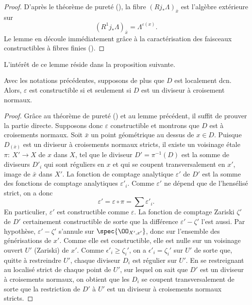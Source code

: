 \documentclass[10pt]{../fichiers-configuration-latex/smfart}
\begin{document}
\begin{proof}D'après le théorème de pureté (), la
fibre $(Rj_*\Lambda)_{\bar x}$ est l'algèbre extérieure sur $$(R^1j_*\Lambda)_{\bar
x}=\Lambda^{\varepsilon(x)}.$$ Le lemme en découle immédiatement grâce à la caractérisation des
faisceaux constructibles à fibres finies ().\end{proof}

L'intérêt de ce lemme réside dans la proposition  suivante.

\begin{proposition} Avec les notations précédentes, supposons de plus que $D$ est localement dcn.
Alors, $\varepsilon$ est constructible si et seulement si $D$ est un diviseur à croisement
normaux.\end{proposition}

\begin{proof} Grâce au théorème de pureté () et au
lemme précédent, il suffit de prouver la partie directe. Supposons donc $\varepsilon$ constructible
et montrons que $D$ est à croisements normaux. Soit $\bar x$ un point géométrique au dessus de $x\in
D$. Puisque $D_{(\bar x)}$ est un diviseur à croisements normaux stricts, il existe un voisinage
étale $\pi:\ X'\rightarrow X$ de $x$ dans $X$, tel que le diviseur $D'=\pi^{-1}(D)$ est la somme de
diviseurs $D'_i$ qui sont réguliers en $x$ et qui se coupent transversalement en $x'$, image de
$\bar x$ dans $X'$. La fonction de comptage analytique $\varepsilon'$ de $D'$ est la somme des
fonctions de comptage analytiques $\varepsilon'_i$. Comme $\varepsilon'$   ne dépend que de
l'hensélisé strict, on a donc $$\varepsilon'=\varepsilon\circ\pi=\sum\varepsilon'_i.$$ En
particulier, $\varepsilon'$ est constructible comme $\varepsilon$. La fonction de comptage Zariski
$\zeta'$ de $D'$ certainement constructible de sorte que la différence $\varepsilon'-\zeta'$ l'est
aussi. Par hypothèse, $\varepsilon'-\zeta'$ s'annule sur $\spec{\OO_{X',x'}}$, donc sur l'ensemble
des générisations de $x'$. Comme elle est constructible, elle est nulle sur un voisinage ouvert $U'$
(Zariski) de $x'$. Comme $\epsilon'_i\geq\zeta_i'$, on a $\epsilon'_i=\zeta_i'$ sur $U'$ de sorte
que, quitte à restreindre $U'$, chaque diviseur $D_i$ est régulier sur $U'$. En se restreignant au
localisé strict de chaque point de $U'$, sur lequel on sait que $D'$ est un diviseur à croisements
normaux, on obtient que les $D_i$ se coupent transversalement de sorte que  la restriction de $D'$ à
$U'$ est un diviseur à croisements normaux stricts.\end{proof}
 
\end{document}
